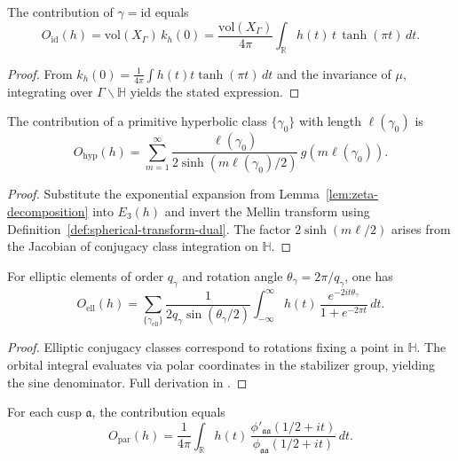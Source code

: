 \begin{lemma}
\label{lem:identity-term}
The contribution of $\gamma=\mathrm{id}$ equals
\[
O_{\mathrm{id}}(h)
= \mathrm{vol}(X_\Gamma)\,k_h(0)
= \frac{\mathrm{vol}(X_\Gamma)}{4\pi}\int_{\mathbb{R}} h(t)\,t\,\tanh(\pi t)\,dt.
\]
\end{lemma}

\begin{proof}\relax
From $k_h(0)=\frac{1}{4\pi}\int h(t)t\tanh(\pi t)\,dt$ and the invariance of $\mu$, integrating over $\Gamma\backslash\mathbb{H}$ yields the stated expression. \relax
\end{proof}

\begin{lemma}
\label{lem:hyperbolic-term}
The contribution of a primitive hyperbolic class $\{\gamma_0\}$ with length $\ell(\gamma_0)$ is
\[
O_{\mathrm{hyp}}(h)
=\sum_{m=1}^{\infty}\frac{\ell(\gamma_0)}{2\sinh(m\ell(\gamma_0)/2)}\,g(m\ell(\gamma_0)).
\]
\end{lemma}

\begin{proof}\relax
Substitute the exponential expansion from Lemma~\ref{lem:zeta-decomposition} into $E_3(h)$ and invert the Mellin transform using Definition~\ref{def:spherical-transform-dual}. The factor $2\sinh(m\ell/2)$ arises from the Jacobian of conjugacy class integration on $\mathbb{H}$. \relax
\end{proof}

\begin{lemma}
\label{lem:elliptic-term}
For elliptic elements of order $q_\gamma$ and rotation angle $\theta_\gamma=2\pi/q_\gamma$, one has
\[
O_{\mathrm{ell}}(h)
=\sum_{\{\gamma_{\mathrm{ell}}\}}
\frac{1}{2q_\gamma\sin(\theta_\gamma/2)}
\int_{-\infty}^{\infty}h(t)\,
\frac{e^{-2i t\theta_\gamma}}{1+e^{-2\pi t}}\,dt.
\]
\end{lemma}

\begin{proof}\relax
Elliptic conjugacy classes correspond to rotations fixing a point in $\mathbb{H}$. The orbital integral evaluates via polar coordinates in the stabilizer group, yielding the sine denominator. Full derivation in \cite[§12]{Hejhal1983vol2}. \relax
\end{proof}

\begin{lemma}
\label{lem:parabolic-term}
For each cusp $\mathfrak a$, the contribution equals
\[
O_{\mathrm{par}}(h)
= \frac{1}{4\pi}\int_{\mathbb{R}}h(t)\,
\frac{\phi'_{\mathfrak a\mathfrak a}(1/2+it)}{\phi_{\mathfrak a\mathfrak a}(1/2+it)}\,dt.
\]
\end{lemma}

